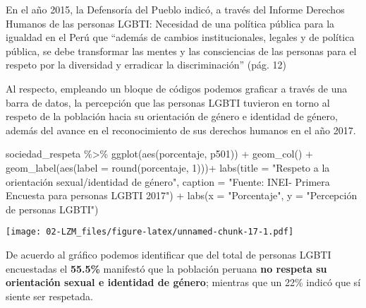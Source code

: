 \documentclass[
]{book}
\newenvironment{Shaded}{\begin{snugshade}}{\end{snugshade}}
\newcommand{\AttributeTok}[1]{\textcolor[rgb]{0.77,0.63,0.00}{#1}}
\newcommand{\DecValTok}[1]{\textcolor[rgb]{0.00,0.00,0.81}{#1}}
\newcommand{\FunctionTok}[1]{\textcolor[rgb]{0.00,0.00,0.00}{#1}}
\newcommand{\NormalTok}[1]{#1}
\newcommand{\SpecialCharTok}[1]{\textcolor[rgb]{0.00,0.00,0.00}{#1}}
\newcommand{\StringTok}[1]{\textcolor[rgb]{0.31,0.60,0.02}{#1}}
\theoremstyle{definition}
\theoremstyle{definition}
\theoremstyle{definition}
\theoremstyle{definition}
\theoremstyle{remark}
\begin{document}
En el año 2015, la Defensoría del Pueblo indicó, a través del Informe Derechos Humanos de las personas LGBTI: Necesidad de una política pública para la igualdad en el Perú que ``además de cambios institucionales, legales y de política pública, se debe transformar las mentes y las consciencias de las personas para el respeto por la diversidad y erradicar la discriminación'' (pág. 12)

Al respecto, empleando un bloque de códigos podemos graficar a través de una barra de datos, la percepción que las personas LGBTI tuvieron en torno al respeto de la población hacia su orientación de género e identidad de género, además del avance en el reconocimiento de sus derechos humanos en el año 2017.

\begin{Shaded}
\begin{Highlighting}[]
\NormalTok{sociedad\_respeta }\SpecialCharTok{\%\textgreater{}\%} 
  \FunctionTok{ggplot}\NormalTok{(}\FunctionTok{aes}\NormalTok{(porcentaje, p501)) }\SpecialCharTok{+}
  \FunctionTok{geom\_col}\NormalTok{() }\SpecialCharTok{+}
  \FunctionTok{geom\_label}\NormalTok{(}\FunctionTok{aes}\NormalTok{(}\AttributeTok{label =} \FunctionTok{round}\NormalTok{(porcentaje, }\DecValTok{1}\NormalTok{)))}\SpecialCharTok{+}
  \FunctionTok{labs}\NormalTok{(}\AttributeTok{title =} \StringTok{"Respeto a la orientación sexual/identidad de género"}\NormalTok{, }
       \AttributeTok{caption =} \StringTok{"Fuente: INEI{-} Primera Encuesta para personas LGBTI 2017"}\NormalTok{) }\SpecialCharTok{+}
  \FunctionTok{labs}\NormalTok{(}\AttributeTok{x =} \StringTok{"Porcentaje"}\NormalTok{,}
       \AttributeTok{y =} \StringTok{"Percepción de personas LGBTI"}\NormalTok{)}
\end{Highlighting}
\end{Shaded}

\texttt{[image: 02-LZM\_files/figure-latex/unnamed-chunk-17-1.pdf]}

De acuerdo al gráfico podemos identificar que del total de personas LGBTI encuestadas el \textbf{55.5\%} manifestó que la población peruana \textbf{no respeta su orientación sexual e identidad de género}; mientras que un 22\% indicó que sí siente ser respetada.
\end{document}
